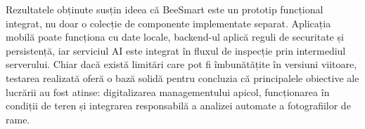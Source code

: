 Rezultatele obținute susțin ideea că BeeSmart este un prototip funcțional integrat, nu doar o colecție de componente implementate separat. Aplicația mobilă poate funcționa cu date locale, backend-ul aplică reguli de securitate și persistență, iar serviciul AI este integrat în fluxul de inspecție prin intermediul serverului. Chiar dacă există limitări care pot fi îmbunătățite în versiuni viitoare, testarea realizată oferă o bază solidă pentru concluzia că principalele obiective ale lucrării au fost atinse: digitalizarea managementului apicol, funcționarea în condiții de teren și integrarea responsabilă a analizei automate a fotografiilor de rame.
